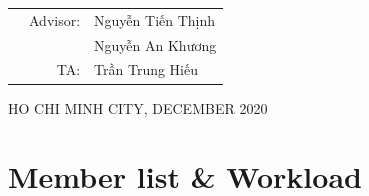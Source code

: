 \documentclass[a4paper]{article}
\begin{document}
\begin{titlepage}
  \begin{table}[h]
    \begin{tabular}{rrl}
      \hspace{5 cm} & Advisor: & Nguyễn Tiến Thịnh \\
                    &          & Nguyễn An Khương  \\
                    & TA:      & Trần Trung Hiếu   \\
    \end{tabular}
  \end{table}

  \begin{center}
    {\footnotesize HO CHI MINH CITY, DECEMBER 2020}
  \end{center}
\end{titlepage}



\newpage
\tableofcontents
\newpage


\section*{Member list \& Workload}
\end{document}
